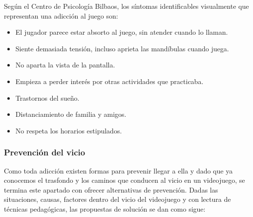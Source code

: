 Según el Centro de Psicología Bilbaos\cite{centrodepsicologiabilbaos.l.p.},
los síntomas identificables visualmente que representan una adicción al juego son:
\begin{itemize}
	\item El jugador parece estar absorto al juego, sin atender cuando lo llaman.
	\item Siente demasiada tensión, incluso aprieta las mandíbulas cuando juega.
	\item No aparta la vista de la pantalla.
	\item Empieza a perder interés por otras actividades que practicaba.
	\item Trastornos del sueño.
	\item Distanciamiento de familia y amigos.
	\item No respeta los horarios estipulados.
\end{itemize}

\subsubsection{Prevención del vicio}
Como toda adicción existen formas para prevenir llegar a ella y dado que ya conocemos el trasfondo y los caminos que conducen al vicio en un videojuego, se termina este apartado con ofrecer alternativas de prevención.
Dadas las situaciones, causas, factores dentro del vicio del videojuego y con lectura de técnicas pedagógicas, las propuestas de solución se dan como sigue:

